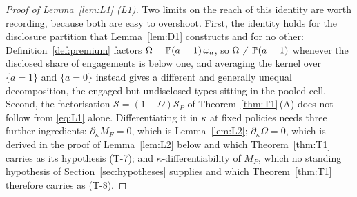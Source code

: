 \begin{proof}[Proof of Lemma~\ref{lem:L1} (L1)]
Two limits on the reach of this identity are worth recording, because both are easy to overshoot.
First, the identity holds for the disclosure partition that Lemma~\ref{lem:D1} constructs and for no
other: Definition~\ref{def:premium} factors $\Omega = \mathbb{P}(a=1)\,\omega_a$, so
$\Omega \ne \mathbb{P}(a=1)$ whenever the disclosed share of engagements is below one, and averaging the
kernel over $\{a=1\}$ and $\{a=0\}$ instead gives a different and generally unequal decomposition,
the engaged but undisclosed types sitting in the pooled cell. Second, the factorisation
$\mathcal S = (1-\Omega)\mathcal S_P$ of Theorem~\ref{thm:T1}\,(A) does not follow from
\eqref{eq:L1} alone. Differentiating it in $\kappa$ at fixed policies needs three further
ingredients: $\partial_\kappa M_F = 0$, which is Lemma~\ref{lem:L2}; $\partial_\kappa\Omega = 0$,
which is derived in the proof of Lemma~\ref{lem:L2} below and which Theorem~\ref{thm:T1} carries as
its hypothesis (T-7); and $\kappa$-differentiability of $M_P$, which no standing hypothesis of
Section~\ref{sec:hypotheses} supplies and which Theorem~\ref{thm:T1} therefore carries as (T-8).
\end{proof}

